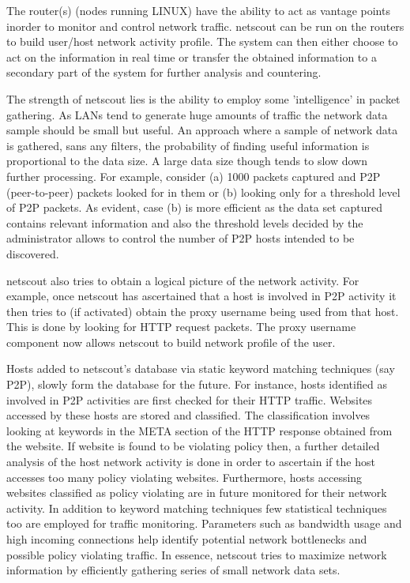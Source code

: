 \documentclass[twocolumn]{article}
\makeatletter
\def\section{\@startsection {section}{1}{\z@}{1.0ex plus 1ex minus .2ex}{.2ex plus .2ex}{\large\bf}}
\makeatother
\begin{document}
The router(s) (nodes running LINUX) have the ability to act as vantage points inorder to monitor and control network traffic.
netscout \cite{netscout} can be run on the routers to build user/host network activity profile. 
The system can then either choose to act on the information in real time or transfer the obtained
information to a secondary part of the system for further analysis and countering.

\section{The netscout Advantage}
The strength of netscout lies is the ability to employ some 'intelligence' in packet gathering. As LANs
tend to generate huge amounts of traffic the network data sample should be small but useful. An approach where 
a sample of network data is gathered, sans any filters, the probability of finding useful information is
proportional to the data size. A large data size though tends to slow down further processing. For example,
consider (a) 1000 packets captured and P2P (peer-to-peer) packets looked for in them or (b) looking only for a threshold 
level of P2P packets. As evident, case (b) is more efficient as the data set captured contains relevant information 
and also the threshold levels decided by the administrator allows to control the number of P2P hosts  
intended to be discovered.  

netscout also tries to obtain a logical picture of the network activity. For example, once netscout has ascertained
that a host is involved in P2P activity it then tries to (if activated) obtain the proxy username being used
from that host. This is done by looking for HTTP request packets. The proxy username component now
allows netscout to build network profile of the user. 

Hosts added to netscout's database via static keyword matching techniques (say P2P), slowly form the
database for the future. For instance, hosts identified as involved in P2P activities are first
checked for their HTTP traffic. Websites accessed by these hosts are stored and classified. The classification
involves looking at keywords in the META section of the HTTP response obtained from the website. 
If website is found to be violating policy then, a further detailed analysis of the host network 
activity is done in order to ascertain if the host accesses too many policy violating websites. 
Furthermore, hosts accessing websites classified as policy violating are in future monitored for their network activity. 
In addition to keyword matching techniques few statistical techniques too are employed for traffic monitoring.
Parameters such as bandwidth usage and high incoming connections help identify potential network bottlenecks and
possible policy violating traffic.
In essence, netscout tries to maximize network information by efficiently gathering series of small network data sets.
\end{document}
